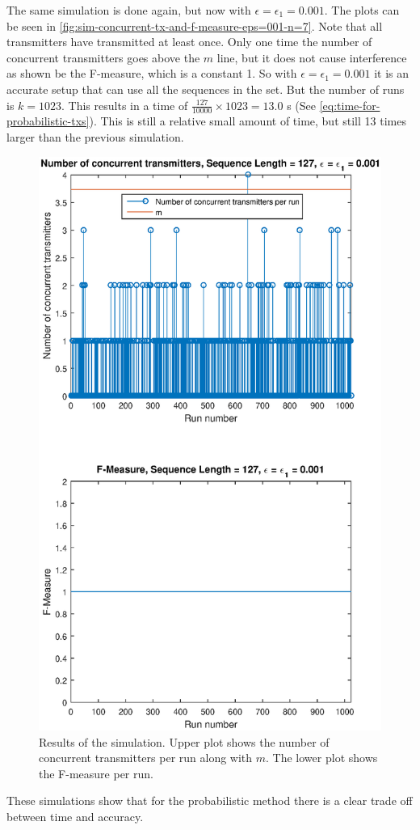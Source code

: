 The same simulation is done again, but now with $\epsilon = \epsilon_1 = 0.001$.
The plots can be seen in \autoref{fig:sim-concurrent-tx-and-f-measure-eps=001-n=7}.
Note that all transmitters have transmitted at least once.
Only one time the number of concurrent transmitters goes above the $m$ line, but it does not cause interference as shown be the F-measure, which is a constant 1.
So with $\epsilon = \epsilon_1 = 0.001$ it is an accurate setup that can use all the sequences in the set.
But the number of runs is $k = 1023$.
This results in a time of $\frac{127}{10000} \times 1023 = 13.0$ s (See \autoref{eq:time-for-probabilistic-txs}).
This is still a relative small amount of time, but still 13 times larger than the previous simulation.


\begin{figure}[tbp]
	\centering
	\includegraphics[width=\textwidth]{chapters/evaluation-chapters/simulation/sim-concurrent-tx-and-f-measure-eps=001-n=7.eps}
	\caption{Results of the simulation. Upper plot shows the number of concurrent transmitters per run along with $m$. The lower plot shows the F-measure per run.}
	\label{fig:sim-concurrent-tx-and-f-measure-eps=001-n=7}
\end{figure}

 

These simulations show that for the probabilistic method there is a clear trade off between time and accuracy.
